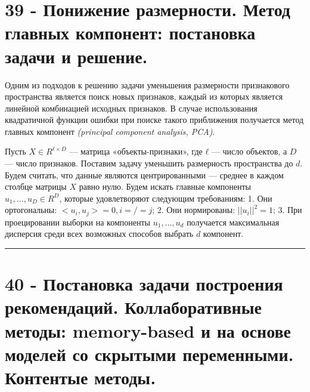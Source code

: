 \documentclass[11pt]{article}
\begin{document}
    \section{39 - Понижение размерности. Метод главных компонент: постановка
задачи и
решение.}\label{ux43fux43eux43dux438ux436ux435ux43dux438ux435-ux440ux430ux437ux43cux435ux440ux43dux43eux441ux442ux438.-ux43cux435ux442ux43eux434-ux433ux43bux430ux432ux43dux44bux445-ux43aux43eux43cux43fux43eux43dux435ux43dux442-ux43fux43eux441ux442ux430ux43dux43eux432ux43aux430-ux437ux430ux434ux430ux447ux438-ux438-ux440ux435ux448ux435ux43dux438ux435.}

Одним из подходов к решению задачи уменьшения размерности признакового
пространства является поиск новых признаков, каждый из которых является
линейной комбинацией исходных признаков. В случае использования
квадратичной функции ошибки при поиске такого приближения получается
метод главных компонент \emph{(principal component analysis, PCA)}.

Пусть \(X ∈ R^{ℓ×D}\) --- матрица «объекты-признаки», где \(ℓ\) ---
число объектов, а \(D\) --- число признаков. Поставим задачу уменьшить
размерность пространства до \(d\). Будем считать, что данные являются
центрированными --- среднее в каждом столбце матрицы \(X\) равно нулю.
Будем искать главные компоненты \(u_1,...,u_D ∈ R^D\), которые
удовлетворяют следующим требованиям: 1. Они ортогональны:
\(<u_i, u_j> = 0, i =/= j\); 2. Они нормированы: \(||u_i||^2 = 1\); 3.
При проецировании выборки на компоненты \(u_1,...,u_d\) получается
максимальная дисперсия среди всех возможных способов выбрать \(d\)
компонент.

    \begin{center}\rule{0.5\linewidth}{\linethickness}\end{center}

    \section{40 - Постановка задачи построения рекомендаций. Коллаборативные
методы: memory-based и на основе моделей со скрытыми переменными.
Контентые
методы.}\label{ux43fux43eux441ux442ux430ux43dux43eux432ux43aux430-ux437ux430ux434ux430ux447ux438-ux43fux43eux441ux442ux440ux43eux435ux43dux438ux44f-ux440ux435ux43aux43eux43cux435ux43dux434ux430ux446ux438ux439.-ux43aux43eux43bux43bux430ux431ux43eux440ux430ux442ux438ux432ux43dux44bux435-ux43cux435ux442ux43eux434ux44b-memory-based-ux438-ux43dux430-ux43eux441ux43dux43eux432ux435-ux43cux43eux434ux435ux43bux435ux439-ux441ux43e-ux441ux43aux440ux44bux442ux44bux43cux438-ux43fux435ux440ux435ux43cux435ux43dux43dux44bux43cux438.-ux43aux43eux43dux442ux435ux43dux442ux44bux435-ux43cux435ux442ux43eux434ux44b.}
\end{document}
